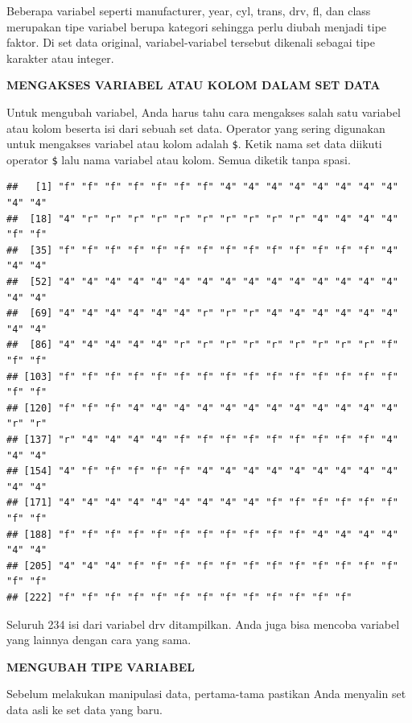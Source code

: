\documentclass[openany]{book}
\newenvironment{Shaded}{\begin{snugshade}}{\end{snugshade}}
\newcommand{\CommentTok}[1]{\textcolor[rgb]{0.56,0.35,0.01}{\textit{#1}}}
\newcommand{\OperatorTok}[1]{\textcolor[rgb]{0.81,0.36,0.00}{\textbf{#1}}}
\newcommand{\NormalTok}[1]{#1}
\begin{document}
Beberapa variabel seperti manufacturer, year, cyl, trans, drv, fl, dan
class merupakan tipe variabel berupa kategori sehingga perlu diubah
menjadi tipe faktor. Di set data original, variabel-variabel tersebut
dikenali sebagai tipe karakter atau integer.

\textbf{MENGAKSES VARIABEL ATAU KOLOM DALAM SET DATA}

Untuk mengubah variabel, Anda harus tahu cara mengakses salah satu
variabel atau kolom beserta isi dari sebuah set data. Operator yang
sering digunakan untuk mengakses variabel atau kolom adalah \texttt{\$}.
Ketik nama set data diikuti operator \texttt{\$} lalu nama variabel atau
kolom. Semua diketik tanpa spasi.

\begin{Shaded}
\end{Shaded}

\begin{verbatim}
##   [1] "f" "f" "f" "f" "f" "f" "f" "4" "4" "4" "4" "4" "4" "4" "4" "4" "4"
##  [18] "4" "r" "r" "r" "r" "r" "r" "r" "r" "r" "r" "4" "4" "4" "4" "f" "f"
##  [35] "f" "f" "f" "f" "f" "f" "f" "f" "f" "f" "f" "f" "f" "f" "4" "4" "4"
##  [52] "4" "4" "4" "4" "4" "4" "4" "4" "4" "4" "4" "4" "4" "4" "4" "4" "4"
##  [69] "4" "4" "4" "4" "4" "4" "r" "r" "r" "4" "4" "4" "4" "4" "4" "4" "4"
##  [86] "4" "4" "4" "4" "4" "r" "r" "r" "r" "r" "r" "r" "r" "r" "f" "f" "f"
## [103] "f" "f" "f" "f" "f" "f" "f" "f" "f" "f" "f" "f" "f" "f" "f" "f" "f"
## [120] "f" "f" "f" "4" "4" "4" "4" "4" "4" "4" "4" "4" "4" "4" "4" "r" "r"
## [137] "r" "4" "4" "4" "4" "f" "f" "f" "f" "f" "f" "f" "f" "f" "4" "4" "4"
## [154] "4" "f" "f" "f" "f" "f" "4" "4" "4" "4" "4" "4" "4" "4" "4" "4" "4"
## [171] "4" "4" "4" "4" "4" "4" "4" "4" "4" "f" "f" "f" "f" "f" "f" "f" "f"
## [188] "f" "f" "f" "f" "f" "f" "f" "f" "f" "f" "f" "4" "4" "4" "4" "4" "4"
## [205] "4" "4" "4" "f" "f" "f" "f" "f" "f" "f" "f" "f" "f" "f" "f" "f" "f"
## [222] "f" "f" "f" "f" "f" "f" "f" "f" "f" "f" "f" "f" "f"
\end{verbatim}

Seluruh 234 isi dari variabel drv ditampilkan. Anda juga bisa mencoba
variabel yang lainnya dengan cara yang sama.

\textbf{MENGUBAH TIPE VARIABEL}

Sebelum melakukan manipulasi data, pertama-tama pastikan Anda menyalin
set data asli ke set data yang baru.
\end{document}
